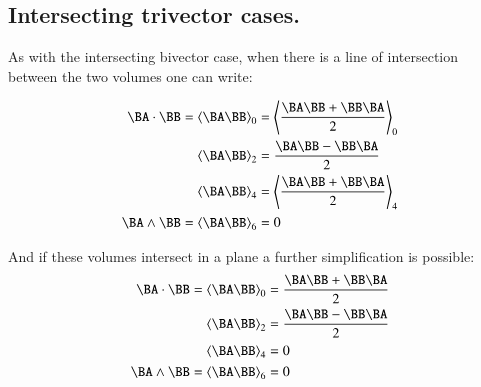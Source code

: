\documentclass{article}      %
\newcommand{\gpgrade}[2] {{\left\langle{{#1}}\right\rangle}_{#2}}
\begin{document}
\subsection{ Intersecting trivector cases. }

As with the intersecting bivector case, when there is a line of intersection between the two volumes one can
write:

\begin{align*}
\BA \cdot \BB = \gpgrade{\BA\BB}{0} &= \gpgrade{\frac{\BA\BB + \BB\BA}{2}}{0} \\
\gpgrade{\BA\BB}{2} &= \frac{\BA\BB - \BB\BA}{2} \\
\gpgrade{\BA\BB}{4} &= \gpgrade{\frac{\BA\BB + \BB\BA}{2}}{4} \\
\BA \wedge \BB = \gpgrade{\BA\BB}{6} &= 0 \\
\end{align*}

And if these volumes intersect in a plane a further simplification is possible:
\begin{align*}
\BA \cdot \BB = \gpgrade{\BA\BB}{0} &= \frac{\BA\BB + \BB\BA}{2} \\
\gpgrade{\BA\BB}{2} &= \frac{\BA\BB - \BB\BA}{2} \\
\gpgrade{\BA\BB}{4} &= 0 \\
\BA \wedge \BB = \gpgrade{\BA\BB}{6} &= 0 \\
\end{align*}
\end{document}
